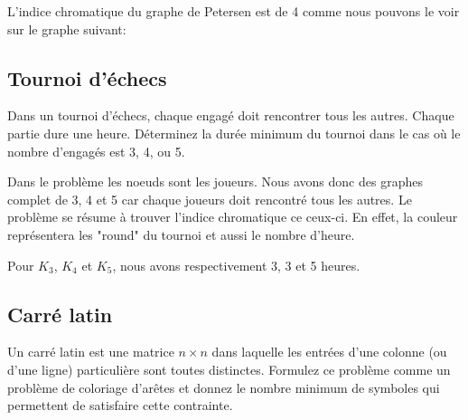\begin{solution}
L'indice chromatique du graphe de Petersen est de 4 comme nous pouvons le voir sur le graphe suivant:

\end{solution}

\subsection{Tournoi d'échecs}
Dans un tournoi d'échecs, chaque engagé doit rencontrer tous les autres. Chaque partie dure une heure. Déterminez la durée minimum du tournoi dans le cas où le nombre d'engagés est 3, 4, ou 5.

\begin{solution}
Dans le problème les noeuds sont les joueurs. Nous avons donc des graphes complet de 3, 4 et 5 car chaque joueurs doit rencontré tous les autres. Le problème se résume à trouver l'indice chromatique ce ceux-ci. En effet, la couleur représentera les "round" du tournoi et aussi le nombre d'heure.

Pour $K_{3}$, $K_{4}$ et $K_{5}$, nous avons respectivement 3, 3 et 5 heures.
\end{solution}

\subsection{Carré latin}
Un carré latin est une matrice $n \times n$ dans laquelle les entrées d'une colonne (ou d'une ligne) particulière sont toutes distinctes. Formulez ce problème comme un problème de coloriage d'arêtes et donnez le nombre minimum de symboles qui permettent de satisfaire cette contrainte.
